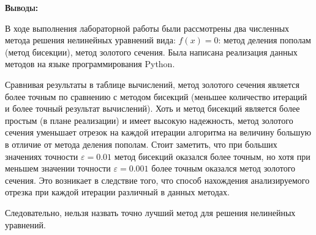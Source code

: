 \documentclass [12pt]{article}
\begin{document}
\textsc{\textbf{Выводы:}}

В ходе выполнения лабораторной работы были рассмотрены два численных метода решения нелинейных уравнений вида: $f(x)=0$: метод деления пополам (метод бисекции), метод золотого сечения. Была написана реализация данных методов на языке программирования Python.

Сравнивая результаты в таблице вычислений, метод золотого сечения является более точным по сравнению с методом бисекций (меньшее количество итераций и более точный результат вычислений). Хоть и метод бисекций является более простым (в плане реализации) и имеет высокую надежность, метод золотого сечения уменьшает отрезок на каждой итерации алгоритма на величину большую в отличие от метода деления пополам. Стоит заметить, что при больших значениях точности $\varepsilon=0.01$ метод бисекций оказался более точным, но хотя при меньшем значении точности $\varepsilon=0.001$ более точным оказался метод золотого сечения. Это возникает в следствие того, что способ нахождения анализируемого отрезка  при каждой итерации различный в данных методах.

Следовательно, нельзя назвать точно лучший метод для решения нелинейных уравнений.
\end{document}
